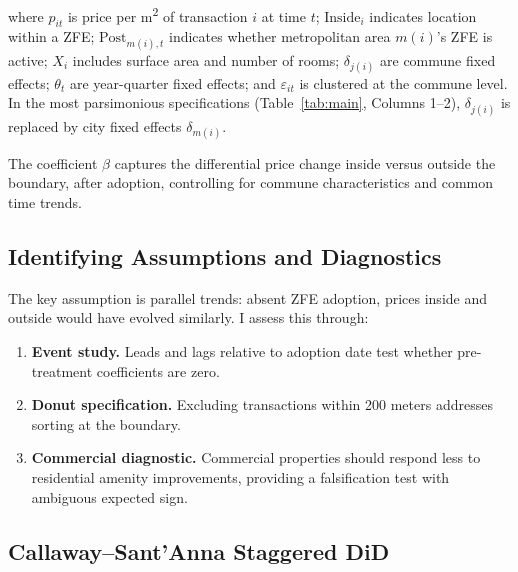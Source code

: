 \documentclass[12pt]{article}
\begin{document}
\noindent where $p_{it}$ is price per m\textsuperscript{2} of transaction $i$ at time $t$; $\text{Inside}_i$ indicates location within a ZFE; $\text{Post}_{m(i),t}$ indicates whether metropolitan area $m(i)$'s ZFE is active; $X_i$ includes surface area and number of rooms; $\delta_{j(i)}$ are commune fixed effects; $\theta_t$ are year-quarter fixed effects; and $\varepsilon_{it}$ is clustered at the commune level. In the most parsimonious specifications (Table~\ref{tab:main}, Columns 1--2), $\delta_{j(i)}$ is replaced by city fixed effects $\delta_{m(i)}$.

The coefficient $\beta$ captures the differential price change inside versus outside the boundary, after adoption, controlling for commune characteristics and common time trends.

\subsection{Identifying Assumptions and Diagnostics}

The key assumption is parallel trends: absent ZFE adoption, prices inside and outside would have evolved similarly. I assess this through:

\begin{enumerate}
\item \textbf{Event study.} Leads and lags relative to adoption date test whether pre-treatment coefficients are zero.
\item \textbf{Donut specification.} Excluding transactions within 200 meters addresses sorting at the boundary.
\item \textbf{Commercial diagnostic.} Commercial properties should respond less to residential amenity improvements, providing a falsification test with ambiguous expected sign.
\end{enumerate}

\subsection{Callaway--Sant'Anna Staggered DiD}
\end{document}
